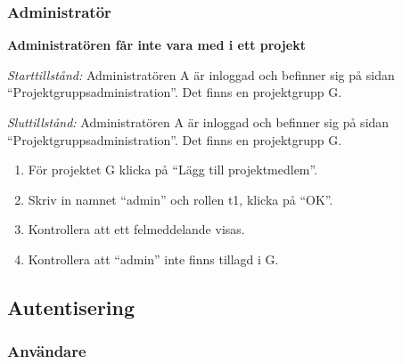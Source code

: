 \documentclass[a4paper]{article}
\begin{document}
\subsubsection{Administratör}
\begin{ST}
\item \textbf{Administratören får inte vara med i ett projekt}

\emph{Starttillstånd:} Administratören A är inloggad och befinner sig på sidan ``Projektgruppsadministration''. Det finns en projektgrupp G.

\emph{Sluttillstånd:} Administratören A är inloggad och befinner sig på sidan ``Projektgruppsadministration''. Det finns en projektgrupp G.

\begin{enumerate}
\item För projektet G klicka på ``Lägg till projektmedlem''.
\item Skriv in namnet ``admin'' och rollen t1, klicka på ``OK''.
\item Kontrollera att ett felmeddelande visas.
\item Kontrollera att ``admin'' inte finns tillagd i G.
\end{enumerate}
\end{ST}




\subsection{Autentisering}


\subsubsection{Användare}
\end{document}
